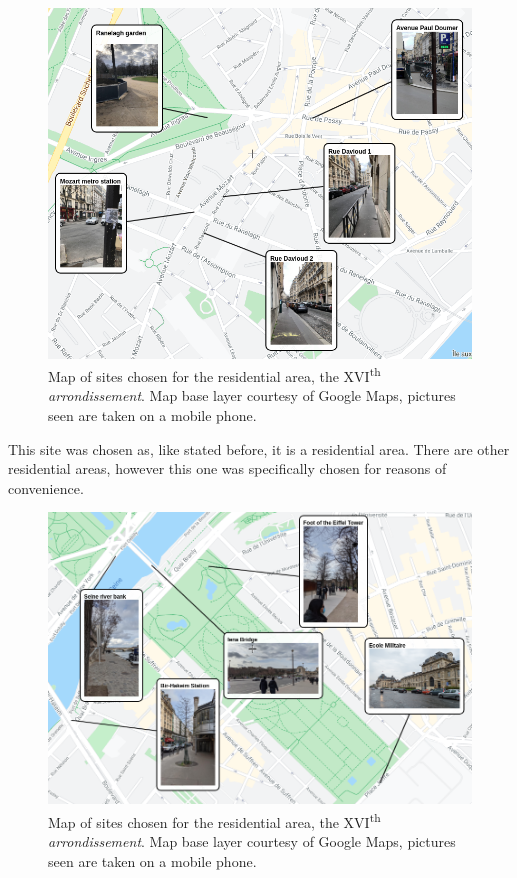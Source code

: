 \documentclass[11pt,letterpaper]{article}
\begin{document}
\begin{figure}[H]
    \begin{minipage}{\textwidth}
        \centering
        \includegraphics[width=0.7\linewidth]{media/16esites.png}
        \caption{Map of sites chosen for the residential area, the XVI\textsuperscript{th} \textit{arrondissement}. Map base layer courtesy of Google Maps, pictures seen are taken on a mobile phone.}
    \end{minipage}
\end{figure}

This site was chosen as, like stated before, it is a residential area. There are other residential areas, however this one was specifically chosen for reasons of convenience.

\begin{figure}[H]
    \begin{minipage}{\textwidth}
        \centering
        \includegraphics[width=0.7\linewidth]{media/7esites.png}
        \caption{Map of sites chosen for the residential area, the XVI\textsuperscript{th} \textit{arrondissement}. Map base layer courtesy of Google Maps, pictures seen are taken on a mobile phone.}
    \end{minipage}
\end{figure}
\end{document}
